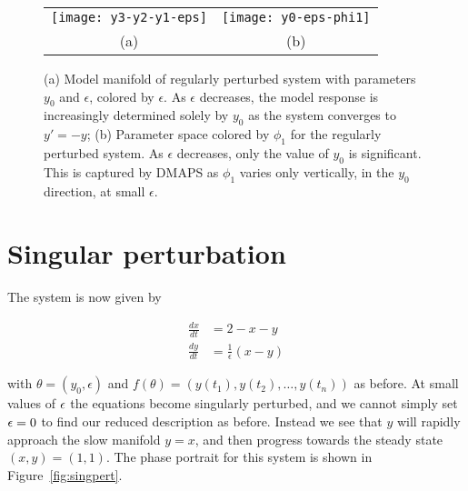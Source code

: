 \begin{figure}[ht!]
\centering
\begin{tabular}{cc}
\texttt{[image: y3-y2-y1-eps]} &
\texttt{[image: y0-eps-phi1]} \\
(a) & (b)\\
\end{tabular}
\caption{(a) Model manifold of regularly perturbed system with
  parameters $y_0$ and $\epsilon$, colored by $\epsilon$. As
  $\epsilon$ decreases, the model response is increasingly determined
  solely by $y_0$ as the system converges to $y' = -y$; (b) Parameter
  space colored by $\phi_1$ for the regularly perturbed system. As
  $\epsilon$ decreases, only the value of $y_0$ is significant. This
  is captured by DMAPS as $\phi_1$ varies only vertically, in the
  $y_0$ direction, at small $\epsilon$. \label{fig:regpert}}
\end{figure}


\section{Singular perturbation}

The system is now given by

\begin{align}
   \frac{dx}{dt}&=2-x-y\\
   \frac{dy}{dt}&= \frac{1}{\epsilon}(x-y)
\end{align}    

with $\theta = (y_0, \epsilon)$ and
$f(\theta) = \left(y(t_1), y(t_2), \dots, y(t_n) \right)$ as
before. At small values of $\epsilon$ the equations become singularly
perturbed, and we cannot simply set $\epsilon = 0$ to find our reduced
description as before. Instead we see that $y$ will rapidly approach
the slow manifold $y = x$, and then progress towards the steady state
$(x,y) = (1,1)$. The phase portrait for this system is shown in
Figure~\ref{fig:singpert}. 


